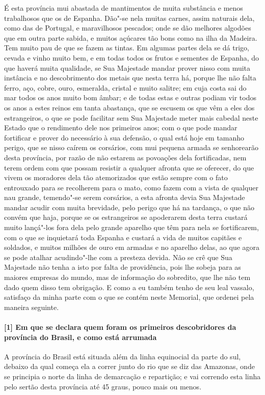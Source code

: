 É esta província mui abastada de mantimentos de muita substância e menos trabalhosos que
os de Espanha. Dão"-se nela muitas carnes, assim naturais dela, como das de Portugal, e
maravilhosos pescados; onde se dão melhores algodões que em outra parte sabida, e muitos
açúcares tão bons como na ilha da Madeira. Tem muito pau de que se fazem as tintas. Em
algumas partes dela se dá trigo, cevada e vinho muito bem, e em todas todos os frutos e
sementes de Espanha, do que haverá muita qualidade, se Sua Majestade mandar prover nisso
com muita instância e no descobrimento dos metais que nesta terra há, porque lhe não falta
ferro, aço, cobre, ouro, esmeralda, cristal e muito salitre; em cuja costa sai do mar
todos os anos muito bom âmbar; e de todas estas e outras podiam vir todos os anos a estes
reinos em tanta abastança, que se escusem os que vêm a eles dos estrangeiros, o que se
pode facilitar sem Sua Majestade meter mais cabedal neste Estado que o rendimento dele nos
primeiros anos; com o que pode mandar fortificar e prover do necessário à sua defensão, o
qual está hoje em tamanho perigo, que se nisso caírem os corsários, com mui pequena armada
se senhorearão desta província, por razão de não estarem as povoações dela fortificadas,
nem terem ordem com que possam resistir a qualquer afronta que se oferecer, do que vivem
os moradores dela tão atemorizados que estão sempre com o fato entrouxado para se
recolherem para o mato, como fazem com a vista de qualquer nau grande, temendo"-se serem
corsários, a esta afronta devia Sua Majestade mandar acudir com muita brevidade, pelo
perigo que há na tardança, o que não convém que haja, porque se os estrangeiros se
apoderarem desta terra custará muito lançá"-los fora dela pelo grande aparelho que têm para
nela se fortificarem, com o que se inquietará toda Espanha e custará a vida de muitos
capitães e soldados, e muitos milhões de ouro em armadas e no aparelho delas, ao que agora
se pode atalhar acudindo"-lhe com a presteza devida. Não se crê que Sua Majestade não tenha
a isto por falta de providência, pois lhe sobeja para as maiores empresas do mundo, mas de
informação do sobredito, que lhe não tem dado quem disso tem obrigação. E como a eu também
tenho de seu leal vassalo, satisfaço da minha parte com o que se contém neste Memorial,
que ordenei pela maneira seguinte.

\paragraph{[1] Em que se declara quem foram os primeiros descobridores da província do
Brasil, e como está arrumada} \quad
A província do Brasil está situada além da linha equinocial da parte do sul, debaixo da
qual começa ela a correr junto do rio que se diz das Amazonas, onde se principia o norte
da linha de demarcação e repartição; e vai correndo esta linha pelo sertão desta província
até 45 graus, pouco mais ou menos.

